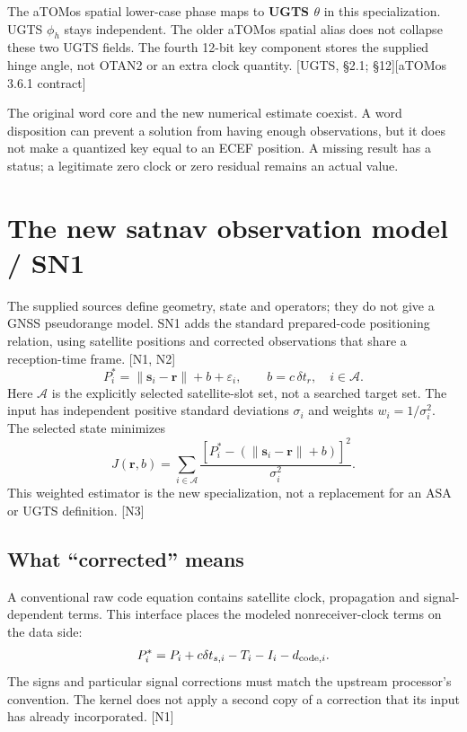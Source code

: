 \documentclass[11pt,a4paper]{article}
\newcommand{\uRef}[1]{\textcolor{muted}{[UGTS, #1]}}
\newcommand{\aRef}{\textcolor{muted}{[aTOMos 3.6.1 contract]}}
\begin{document}
The aTOMos spatial lower-case phase maps to \textbf{UGTS $\theta$} in this specialization.
UGTS $\phi_h$ stays independent. The older aTOMos spatial alias does not collapse these two UGTS fields.
The fourth 12-bit key component stores the supplied hinge angle, not OTAN2 or an extra clock quantity.
\uRef{\S2.1; \S12}\aRef

The original word core and the new numerical estimate coexist. A word disposition can prevent a solution
from having enough observations, but it does not make a quantized key equal to an ECEF position. A missing
result has a status; a legitimate zero clock or zero residual remains an actual value.
\clearpage

\section{The new satnav observation model / SN1}
The supplied sources define geometry, state and operators; they do not give a GNSS pseudorange model.
SN1 adds the standard prepared-code positioning relation, using satellite positions and corrected observations
that share a reception-time frame. [N1, N2]
\begin{equation}\label{eq:observation}
P_i^*=\|\mathbf s_i-\mathbf r\|+b+\varepsilon_i,
\qquad b=c\,\delta t_r,\quad i\in\mathcal A.
\end{equation}
Here $\mathcal A$ is the explicitly selected satellite-slot set, not a searched target set.
The input has independent positive standard deviations $\sigma_i$ and weights $w_i=1/\sigma_i^2$.
The selected state minimizes
\begin{equation}
J(\mathbf r,b)=\sum_{i\in\mathcal A}\frac{[P_i^*-(\|\mathbf s_i-\mathbf r\|+b)]^2}{\sigma_i^2}.
\end{equation}
This weighted estimator is the new specialization, not a replacement for an ASA or UGTS definition. [N3]

\subsection{What ``corrected'' means}
A conventional raw code equation contains satellite clock, propagation and signal-dependent terms.
This interface places the modeled nonreceiver-clock terms on the data side:
\begin{equation}
P_i^*=P_i+c\delta t_{s,i}-T_i-I_i-d_{{\rm code},i}.
\end{equation}
The signs and particular signal corrections must match the upstream processor's convention.
The kernel does not apply a second copy of a correction that its input has already incorporated. [N1]
\end{document}
